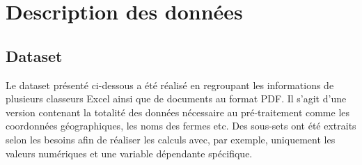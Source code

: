 \appendix

\chapter{Description des données}
\section{Dataset}
Le dataset présenté ci-dessous a été réalisé en regroupant les informations de plusieurs classeurs Excel ainsi que de documents au format PDF. Il s'agit d'une version contenant la totalité des données nécessaire au pré-traitement comme les coordonnées géographiques, les noms des fermes etc. Des sous-sets ont été extraits selon les besoins afin de réaliser les calculs avec, par exemple, uniquement les valeurs numériques et une variable dépendante spécifique. 



